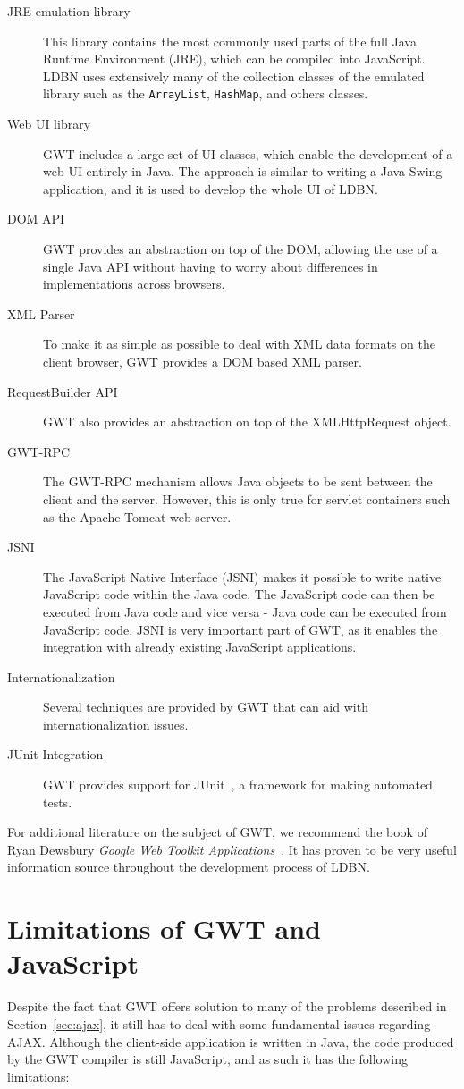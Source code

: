 \begin{description}
	\item[JRE emulation library] This library contains 
	the most commonly used parts of the full Java Runtime Environment (JRE), 
	which can be compiled into JavaScript. LDBN uses extensively many of the collection 
	classes of the emulated library such as the \verb=ArrayList=, \verb=HashMap=, 
	and others classes.
	\item[Web UI library] GWT includes a large set of UI classes, which 
	enable the development of a web UI entirely in Java. The approach is similar 
	to writing a Java Swing application, and it is used to develop the whole UI 
	of LDBN. 
	\item[DOM API] GWT provides an abstraction on top of the DOM, 
	allowing the use of a single Java API without having to worry about 
	differences in implementations across browsers.
	\item[XML Parser] To make it as simple as possible to deal with XML data formats 
	on the client browser, GWT provides a DOM based XML parser.
	\item[RequestBuilder API] GWT also provides an abstraction on top of the
	XMLHttpRequest object. 
	\item[GWT-RPC] The GWT-RPC mechanism allows Java objects to be sent between 
	the client and the server. However, this is only true for 
	servlet containers such as the Apache Tomcat web server. 
	\item[JSNI] The JavaScript Native Interface (JSNI) makes it possible to
	write native JavaScript code within the Java code. The JavaScript code can 
	then be executed from Java code and vice versa - Java code can be executed
	from JavaScript code. JSNI is very important part of GWT, as it enables 
	the integration with already existing JavaScript applications.  
	\item[Internationalization] Several techniques are provided by GWT that can 
	aid with internationalization issues.
	\item[JUnit Integration] GWT provides support for JUnit~\cite{wjunit}, 
	a framework for making automated tests.
\end{description}

For additional literature on the subject of GWT, we recommend the book of 
Ryan Dewsbury \textit{Google Web Toolkit Applications}~\cite{bgwt2}. It has
proven to be very useful information source throughout the development process 
of LDBN.  

\section{Limitations of GWT and JavaScript}
Despite the fact that GWT offers solution to many of the problems
described in Section~\ref{sec:ajax}, it still has to deal with some 
fundamental issues regarding 
AJAX. Although the client-side application is written in Java, 
the code produced by the GWT compiler is still JavaScript, and
as such it has the following limitations:
   
